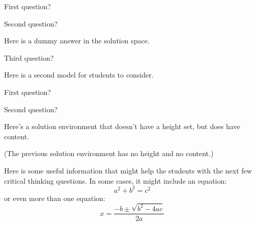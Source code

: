 \begin{activity}
\begin{ctqs}
	\question First question?
	
		\begin{solution}[1in]
		\end{solution}
		
	\question Second question?
	
		\begin{solution}[1in]
			Here is a dummy answer in the solution space.
		\end{solution}
		
	\question Third question?
	
		\begin{solution}[1in]
		
			
			
		\end{solution}

\end{ctqs}



\begin{model}[DEF]

	Here is a second model for students to consider.

\end{model}

\begin{ctqs}

	\question First question?
	
		\begin{solution}
		\end{solution}
	
	\question Second question?
	
		\begin{solution}
		
			Here's a solution environment that doesn't have a height set, but does have content.
			
			(The previous solution environment has no height and no content.)		
		
		\end{solution}
\end{ctqs}

		
\begin{infobox}
	Here is some useful information that might help the students with the next few critical thinking questions.
	In some cases, it might include an equation:
	\begin{equation*}
		a^2 + b^2 = c^2
	\end{equation*}
	or even more than one equation:
	\begin{equation*}
		x=\frac{-b \pm \sqrt{b^2-4ac}}{2a}
	\end{equation*}
\end{infobox}


\end{activity}
